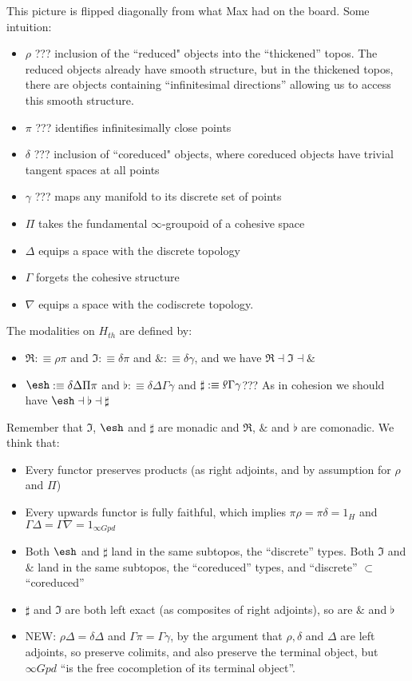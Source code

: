\documentclass[a4paper,12pt]{article}
\newcommand{\Red}{\Re}
\newcommand{\Cored}{\Im}
\newcommand{\Wat}{\&}
\newcommand{\shape}{\ensuremath{\mathord{\raisebox{0.5pt}{\text{\rm\esh}}}}}
\newcommand{\rotdel}{\rotatebox[origin=c]{180}{$\delta$}}
\begin{document}
This picture is flipped diagonally from what Max had on the board. Some intuition:
\begin{itemize}
\item $\rho$ ??? inclusion of the ``reduced" objects into the ``thickened'' topos.  The reduced objects already have smooth structure, but in the thickened topos, there are objects containing ``infinitesimal directions'' allowing us to access this smooth structure.
\item $\pi$ ??? identifies infinitesimally close points
\item $\delta$ ??? inclusion of ``coreduced" objects, where coreduced objects have trivial tangent spaces at all points
\item $\gamma$ ??? maps any manifold to its discrete set of points
\item $\Pi$ takes the fundamental $\infty$-groupoid of a cohesive space
\item $\Delta$ equips a space with the discrete topology
\item $\Gamma$ forgets the cohesive structure
\item $\nabla$ equips a space with the codiscrete topology.
\end{itemize}
The modalities on $H_{th}$ are defined by:
\begin{itemize}
\item $\Red :\equiv \rho\pi$ and $\Cored :\equiv \delta\pi$ and $\Wat :\equiv \delta\gamma$, and we have $\Red \dashv \Cored \dashv \Wat$
\item $\shape :\equiv \delta \Delta \Pi \pi$ and $\flat :\equiv \delta \Delta \Gamma \gamma$ and $\sharp :\equiv \rotdel \Gamma \gamma$??? As in cohesion we should have $\shape \dashv \flat \dashv \sharp$
\end{itemize}
Remember that $\Cored$, $\shape$ and $\sharp$ are monadic and $\Red$, $\Wat$ and $\flat$ are comonadic. We think that:
\begin{itemize}
\item Every functor preserves products (as right adjoints, and by assumption for $\rho$ and $\Pi$)
\item Every upwards functor is fully faithful, which implies $\pi\rho = \pi\delta = 1_H$ and $\Gamma\Delta = \Gamma\nabla = 1_{\infty Gpd}$
\item Both $\shape$ and $\sharp$ land in the same subtopos, the ``discrete'' types. Both $\Cored$ and $\Wat$ land in the same subtopos, the ``coreduced'' types, and ``discrete'' $\subset$ ``coreduced''
\item $\sharp$ and $\Cored$ are both left exact (as composites of right adjoints), so are $\Wat$ and $\flat$
\item NEW: $\rho \Delta = \delta \Delta$ and $\Gamma\pi = \Gamma\gamma$, by the argument that $\rho, \delta$ and $\Delta$ are left adjoints, so preserve colimits, and also preserve the terminal object, but $\infty Gpd$ ``is the free cocompletion of its terminal object''.
\end{itemize} 
\end{document}
